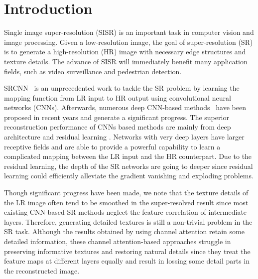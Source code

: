 \documentclass[runningheads]{llncs}
\begin{document}
\section{Introduction}

Single image super-resolution (SISR) is an important task in computer vision and image processing. Given a low-resolution image, the goal of super-resolution (SR) is to generate a high-resolution (HR) image with necessary edge structures and texture details. 
The advance of SISR will immediately benefit many application fields, such as video surveillance and pedestrian detection. 


SRCNN~\cite{dong2014learning} is an unprecedented work to tackle the SR problem by learning the mapping function from LR input to HR output using convolutional neural networks (CNNs). Afterwards, numerous deep CNN-based methods~\cite{ren2019face,ren2018deep} have been proposed in recent years and generate a significant progress.
The superior reconstruction performance of CNNs based methods are
mainly from deep architecture and residual learning \cite{he2016deep}.
Networks with very deep layers have larger receptive fields and are able to provide a powerful capability to learn a complicated mapping between the LR input and the HR counterpart.
Due to the residual learning, the depth of the SR networks are going to deeper since residual learning could  efficiently alleviate the gradient vanishing and exploding problems.


Though significant progress have been made, we note that the texture details of the LR image often tend to be smoothed in the super-resolved result since most existing CNN-based SR methods neglect the feature correlation of intermediate layers.
Therefore, generating detailed textures is still a non-trivial problem in the SR task.
Although the results obtained by using channel attention \cite{zhang2018image,dai2019second} retain some detailed information, these channel attention-based approaches struggle in preserving informative textures
and restoring natural details since they treat the feature maps at different layers equally and result in lossing some detail parts in the reconstructed image. 
\end{document}
